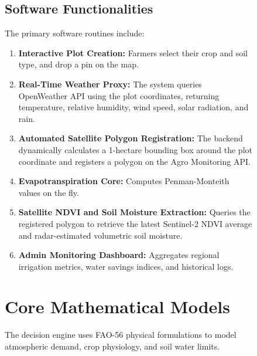 \documentclass[3p,twocolumn]{elsarticle}
\begin{document}
\begin{figure}[t]
\subsection{Software Functionalities}
The primary software routines include:
\begin{enumerate}
    \item \textbf{Interactive Plot Creation:} Farmers select their crop and soil type, and drop a pin on the map.
    \item \textbf{Real-Time Weather Proxy:} The system queries OpenWeather API using the plot coordinates, returning temperature, relative humidity, wind speed, solar radiation, and rain.
    \item \textbf{Automated Satellite Polygon Registration:} The backend dynamically calculates a 1-hectare bounding box around the plot coordinate and registers a polygon on the Agro Monitoring API.
    \item \textbf{Evapotranspiration Core:} Computes Penman-Monteith values on the fly.
    \item \textbf{Satellite NDVI and Soil Moisture Extraction:} Queries the registered polygon to retrieve the latest Sentinel-2 NDVI average and radar-estimated volumetric soil moisture.
    \item \textbf{Admin Monitoring Dashboard:} Aggregates regional irrigation metrics, water savings indices, and historical logs.
\end{enumerate}

\section{Core Mathematical Models}

The decision engine uses FAO-56 physical formulations to model atmospheric demand, crop physiology, and soil water limits.


\end{figure}
\end{document}

